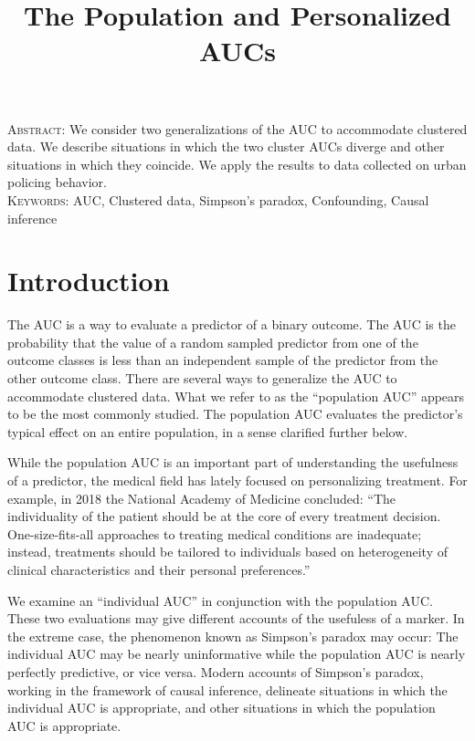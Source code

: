 \documentclass[12pt]{article}
\title{The Population and Personalized AUCs}
\begin{document}
\maketitle
\noindent\textsc{Abstract:} We consider two generalizations of the AUC to accommodate
clustered data. We describe situations in which the two cluster AUCs
diverge and other situations in which they coincide. We apply the
results to data collected on urban policing behavior.\\
\textsc{Keywords:} AUC, Clustered data, Simpson's paradox,  Confounding, Causal inference

\section{Introduction}
The AUC is a way to evaluate a predictor of a binary outcome. The AUC
is the probability that the value of a random sampled predictor from one
of the outcome classes is less than an independent sample of the
predictor from the other outcome class. There are several
ways to generalize the AUC to accommodate clustered data. What we
refer to as the ``population AUC'' appears to be the most commonly
studied. The population AUC evaluates the predictor's typical effect
on an entire population, in a sense clarified further below.

While the population AUC is an important part of understanding the
usefulness of a predictor, the medical field has lately focused on
personalizing treatment. %
For example, in 2018 the National Academy of Medicine concluded: ``The
individuality of the patient should be at the core of every treatment
decision. One-size-fits-all approaches to treating medical conditions
are inadequate; instead, treatments should be tailored to individuals
based on heterogeneity of clinical characteristics and their personal
preferences.''

We examine an ``individual AUC'' in conjunction with the population
AUC.  These two evaluations may give different accounts of the
usefuless of a marker. In the extreme case, the phenomenon known as
Simpson's paradox may occur: The individual AUC may be nearly
uninformative while the population AUC is nearly perfectly
predictive, or vice versa. Modern accounts of Simpson's paradox,
working in the framework of causal inference, delineate situations in
which the individual AUC is appropriate, and other situations in which
the population AUC is appropriate. 
  
\end{document}
